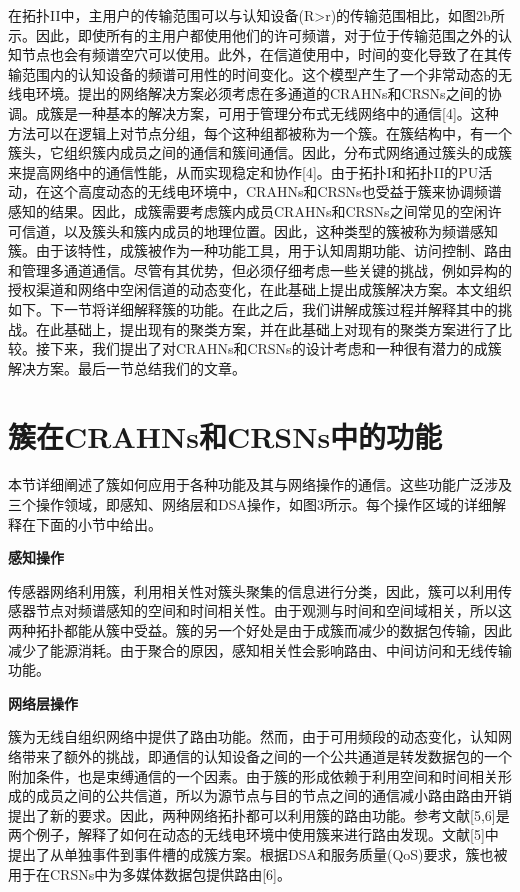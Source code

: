 \documentclass[a4paper,AutoFakeBold,oneside,12pt]{book}
\begin{document}
  在拓扑II中，主用户的传输范围可以与认知设备(R>r)的传输范围相比，如图2b所示。因此，即使所有的主用户都使用他们的许可频谱，对于位于传输范围之外的认知节点也会有频谱空穴可以使用。此外，在信道使用中，时间的变化导致了在其传输范围内的认知设备的频谱可用性的时间变化。这个模型产生了一个非常动态的无线电环境。提出的网络解决方案必须考虑在多通道的CRAHNs和CRSNs之间的协调。成簇是一种基本的解决方案，可用于管理分布式无线网络中的通信[4]。这种方法可以在逻辑上对节点分组，每个这种组都被称为一个簇。在簇结构中，有一个簇头，它组织簇内成员之间的通信和簇间通信。因此，分布式网络通过簇头的成簇来提高网络中的通信性能，从而实现稳定和协作[4]。由于拓扑I和拓扑II的PU活动，在这个高度动态的无线电环境中，CRAHNs和CRSNs也受益于簇来协调频谱感知的结果。因此，成簇需要考虑簇内成员CRAHNs和CRSNs之间常见的空闲许可信道，以及簇头和簇内成员的地理位置。因此，这种类型的簇被称为频谱感知簇。由于该特性，成簇被作为一种功能工具，用于认知周期功能、访问控制、路由和管理多通道通信。尽管有其优势，但必须仔细考虑一些关键的挑战，例如异构的授权渠道和网络中空闲信道的动态变化，在此基础上提出成簇解决方案。本文组织如下。下一节将详细解释簇的功能。在此之后，我们讲解成簇过程并解释其中的挑战。在此基础上，提出现有的聚类方案，并在此基础上对现有的聚类方案进行了比较。接下来，我们提出了对CRAHNs和CRSNs的设计考虑和一种很有潜力的成簇解决方案。最后一节总结我们的文章。
 \chapter{簇在CRAHNs和CRSNs中的功能}
  本节详细阐述了簇如何应用于各种功能及其与网络操作的通信。这些功能广泛涉及三个操作领域，即感知、网络层和DSA操作，如图3所示。每个操作区域的详细解释在下面的小节中给出。
  
\begin{center}
\textbf{感知操作}
\end{center}

  传感器网络利用簇，利用相关性对簇头聚集的信息进行分类，因此，簇可以利用传感器节点对频谱感知的空间和时间相关性。由于观测与时间和空间域相关，所以这两种拓扑都能从簇中受益。簇的另一个好处是由于成簇而减少的数据包传输，因此减少了能源消耗。由于聚合的原因，感知相关性会影响路由、中间访问和无线传输功能。
  
  \begin{center}
\textbf{网络层操作}
\end{center}

  簇为无线自组织网络中提供了路由功能。然而，由于可用频段的动态变化，认知网络带来了额外的挑战，即通信的认知设备之间的一个公共通道是转发数据包的一个附加条件，也是束缚通信的一个因素。由于簇的形成依赖于利用空间和时间相关形成的成员之间的公共信道，所以为源节点与目的节点之间的通信减小路由路由开销提出了新的要求。因此，两种网络拓扑都可以利用簇的路由功能。参考文献[5,6]是两个例子，解释了如何在动态的无线电环境中使用簇来进行路由发现。文献[5]中提出了从单独事件到事件槽的成簇方案。根据DSA和服务质量(QoS)要求，簇也被用于在CRSNs中为多媒体数据包提供路由[6]。
\end{document}
